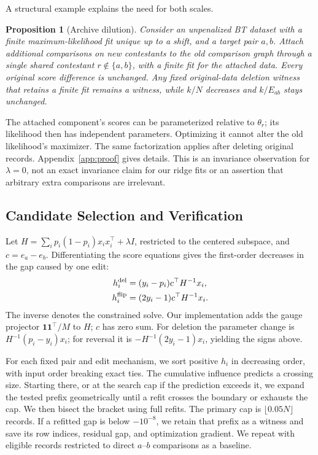 \documentclass{article}
\newtheorem{proposition}{Proposition}
\begin{document}
A structural example explains the need for both scales.
\begin{proposition}[Archive dilution]
Consider an unpenalized BT dataset with a finite maximum-likelihood fit unique up to a shift, and a target pair $a,b$. Attach additional comparisons on new contestants to the old comparison graph through a single shared contestant $r\notin\{a,b\}$, with a finite fit for the attached data. Every original score difference is unchanged. Any fixed original-data deletion witness that retains a finite fit remains a witness, while $k/N$ decreases and $k/E_{ab}$ stays unchanged.
\label{prop:padding}
\end{proposition}
\noindent The attached component's scores can be parameterized relative to $\theta_r$; its likelihood then has independent parameters. Optimizing it cannot alter the old likelihood's maximizer. The same factorization applies after deleting original records. Appendix~\ref{app:proof} gives details. This is an invariance observation for $\lambda=0$, not an exact invariance claim for our ridge fits or an assertion that arbitrary extra comparisons are irrelevant.

\subsection{Candidate Selection and Verification}
Let $H=\sum_i p_i(1-p_i)x_ix_i^\top+\lambda I$, restricted to the centered subspace, and $c=e_a-e_b$. Differentiating the score equations gives the first-order decreases in the gap caused by one edit:
\begin{align}
h_i^{\rm del}&=(y_i-p_i)c^\top H^{-1}x_i,\label{eq:del}\\
h_i^{\rm flip}&=(2y_i-1)c^\top H^{-1}x_i.\label{eq:flip}
\end{align}
The inverse denotes the constrained solve. Our implementation adds the gauge projector $\mathbf1\mathbf1^\top/M$ to $H$; $c$ has zero sum. For deletion the parameter change is $H^{-1}(p_i-y_i)x_i$; for reversal it is $-H^{-1}(2y_i-1)x_i$, yielding the signs above.

For each fixed pair and edit mechanism, we sort positive $h_i$ in decreasing order, with input order breaking exact ties. The cumulative influence predicts a crossing size. Starting there, or at the search cap if the prediction exceeds it, we expand the tested prefix geometrically until a refit crosses the boundary or exhausts the cap. We then bisect the bracket using full refits. The primary cap is $\lfloor0.05N\rfloor$ records. If a refitted gap is below $-10^{-8}$, we retain that prefix as a witness and save its row indices, residual gap, and optimization gradient. We repeat with eligible records restricted to direct $a$--$b$ comparisons as a baseline.
\end{document}
